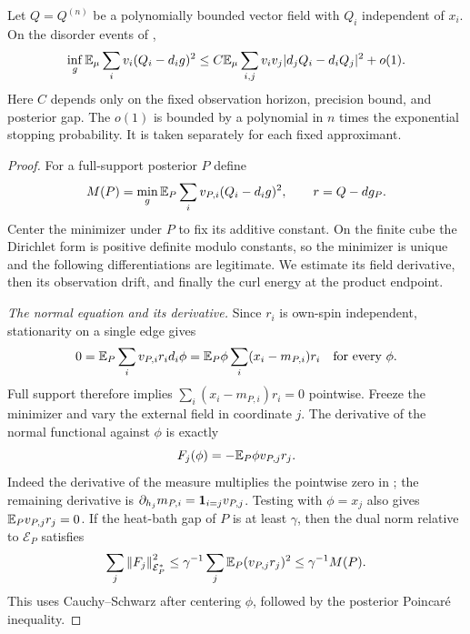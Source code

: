 \begin{lemma}\label{lem:exact-no-defect}
Let $Q=Q^{(n)}$ be a polynomially bounded vector field with $Q_i$
independent of $x_i$.  On the disorder events of
,
\begin{equation}\label{eq:exact-hodge-bound}
 \inf_g\mathbb E_\mu\sum_i v_i(Q_i-d_ig)^2
 \le C\mathbb E_\mu\sum_{i,j}v_iv_j|d_jQ_i-d_iQ_j|^2+o(1).
\end{equation}
Here $C$ depends only on the fixed observation horizon, precision bound,
and posterior gap.  The $o(1)$ is bounded by a polynomial in $n$ times
the exponential stopping probability.  It is taken separately for each
fixed approximant.
\end{lemma}

\begin{proof}
For a full-support posterior $P$ define
\[
 M(P)=\min_g\mathbb E_P\sum_i v_{P,i}(Q_i-d_ig)^2,
 \qquad r=Q-dg_P.
\]
Center the minimizer under $P$ to fix its additive constant.  On the
finite cube the Dirichlet form is positive definite modulo constants, so
the minimizer is unique and the following differentiations are legitimate.
We estimate its field derivative, then its observation drift, and finally
the curl energy at the product endpoint.

\emph{The normal equation and its derivative.}
Since $r_i$ is own-spin independent, stationarity on a single edge gives
\begin{equation}\label{eq:exact-normal}
 0=\mathbb E_P\sum_i v_{P,i}r_i d_i\phi
   =\mathbb E_P\phi\sum_i(x_i-m_{P,i})r_i
 \quad\text{for every }\phi.
\end{equation}
Full support therefore implies
$\sum_i(x_i-m_{P,i})r_i=0$ pointwise.
Freeze the minimizer and vary the external field in coordinate $j$.
The derivative of the normal functional against $\phi$ is exactly
\begin{equation}\label{eq:exact-normal-derivative}
 F_j(\phi)=-\mathbb E_P\phi v_{P,j}r_j.
\end{equation}
Indeed the derivative of the measure multiplies the pointwise zero in
; the remaining derivative is
$\partial_{h_j}m_{P,i}=\mathbf 1_{i=j}v_{P,j}$.
Testing  with $\phi=x_j$ also gives
$\mathbb E_Pv_{P,j}r_j=0$.  If the heat-bath gap of $P$ is at least $\gamma$,
then the dual norm relative to $\mathcal E_P$ satisfies
\begin{equation}\label{eq:exact-normal-dual}
 \sum_j\left\lVert F_j\right\rVert_{\mathcal E_P^*}^2
 \le\gamma^{-1}\sum_j\mathbb E_P(v_{P,j}r_j)^2
 \le\gamma^{-1}M(P).
\end{equation}
This uses Cauchy--Schwarz after centering $\phi$, followed by the
posterior Poincar\'e inequality.


\end{proof}
